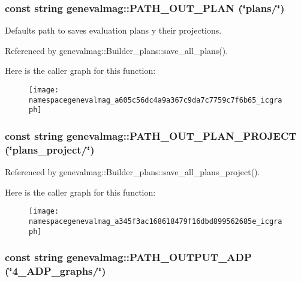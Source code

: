\hypertarget{namespacegenevalmag_a605c56dc4a9a367c9da7c7759c7f6b65}{
\subsubsection[{PATH\_\-OUT\_\-PLAN}]{\setlength{\rightskip}{0pt plus 5cm}const string genevalmag::PATH\_\-OUT\_\-PLAN (\char`\"{}plans/\char`\"{})}}
\label{namespacegenevalmag_a605c56dc4a9a367c9da7c7759c7f6b65}
Defaults path to saves evaluation plans y their projections. 

Referenced by genevalmag::Builder\_\-plans::save\_\-all\_\-plans().



Here is the caller graph for this function:\nopagebreak
\begin{figure}[H]
\begin{center}
\leavevmode
\texttt{[image: namespacegenevalmag\_a605c56dc4a9a367c9da7c7759c7f6b65\_icgraph]}
\end{center}
\end{figure}


\hypertarget{namespacegenevalmag_a345f3ac168618479f16dbd899562685e}{
\subsubsection[{PATH\_\-OUT\_\-PLAN\_\-PROJECT}]{\setlength{\rightskip}{0pt plus 5cm}const string genevalmag::PATH\_\-OUT\_\-PLAN\_\-PROJECT (\char`\"{}plans\_\-project/\char`\"{})}}
\label{namespacegenevalmag_a345f3ac168618479f16dbd899562685e}


Referenced by genevalmag::Builder\_\-plans::save\_\-all\_\-plans\_\-project().



Here is the caller graph for this function:\nopagebreak
\begin{figure}[H]
\begin{center}
\leavevmode
\texttt{[image: namespacegenevalmag\_a345f3ac168618479f16dbd899562685e\_icgraph]}
\end{center}
\end{figure}


\hypertarget{namespacegenevalmag_a609ccdf53fd8e4f1526ef4a396323d7d}{
\subsubsection[{PATH\_\-OUTPUT\_\-ADP}]{\setlength{\rightskip}{0pt plus 5cm}const string genevalmag::PATH\_\-OUTPUT\_\-ADP (\char`\"{}4\_\-ADP\_\-graphs/\char`\"{})}}
\label{namespacegenevalmag_a609ccdf53fd8e4f1526ef4a396323d7d}


